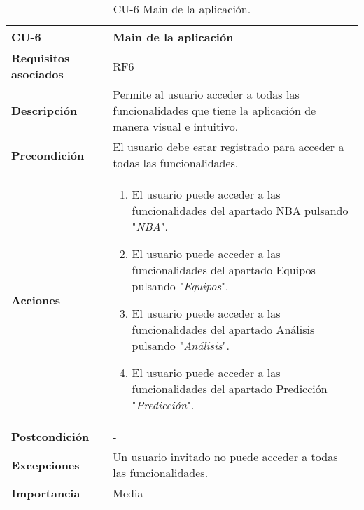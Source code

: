 \begin{table}[p]
	\centering
	\begin{tabularx}{\linewidth}{ p{} p{} }
		\toprule
		\textbf{CU-6}    & \textbf{Main de la aplicación}\\
		\toprule
		\textbf{Requisitos asociados} & RF6 \\
		\textbf{Descripción}          & Permite al usuario acceder a todas las funcionalidades que tiene la aplicación de manera visual e intuitivo. \\
		\textbf{Precondición}         & El usuario debe estar registrado para acceder a todas las funcionalidades. \\
		\textbf{Acciones}             &
		\begin{enumerate}
			\def\labelenumi{\arabic{enumi}.}
			\tightlist
			\item El usuario puede acceder a las funcionalidades del apartado NBA pulsando "\textit{NBA}".
            \item El usuario puede acceder a las funcionalidades del apartado Equipos pulsando "\textit{Equipos}".
            \item El usuario puede acceder a las funcionalidades del apartado Análisis pulsando "\textit{Análisis}".
            \item El usuario puede acceder a las funcionalidades del apartado Predicción "\textit{Predicción}".
		\end{enumerate}\\
		\textbf{Postcondición}        &  - \\
		\textbf{Excepciones}          &  Un usuario invitado no puede acceder a todas las funcionalidades. \\
		\textbf{Importancia}          & Media \\
		\bottomrule
	\end{tabularx}
	\caption{CU-6 Main de la aplicación.}
\end{table}


